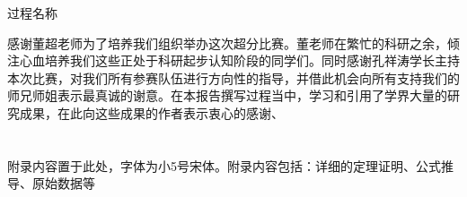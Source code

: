 \documentclass{cjc}
\begin{document}
\begin{procedure}
  \caption{过程名称}
  \small
  \begin{algorithmic}
    \REQUIRE
    \ENSURE
    \STATE {}
  \end{algorithmic}
\end{procedure}




\begin{acknowledgments}
  感谢董超老师为了培养我们组织举办这次超分比赛。董老师在繁忙的科研之余，倾注心血培养我们这些正处于科研起步认知阶段的同学们。同时感谢孔祥涛学长主持本次比赛，对我们所有参赛队伍进行方向性的指导，并借此机会向所有支持我们的师兄师姐表示最真诚的谢意。在本报告撰写过程当中，学习和引用了学界大量的研究成果，在此向这些成果的作者表示衷心的感谢、
\end{acknowledgments}


\nocite{*}





\newpage

\appendix

\section{}

附录内容置于此处，字体为小5号宋体。附录内容包括：详细的定理证明、公式推导、原始数据等


\makebiographies
\end{document}
